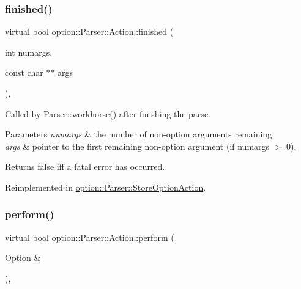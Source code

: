 \subsubsection{\texorpdfstring{finished()}{finished()}}
{\footnotesize\ttfamily virtual bool option\+::\+Parser\+::\+Action\+::finished (\begin{DoxyParamCaption}\item[{int}]{numargs,  }\item[{const char $\ast$$\ast$}]{args }\end{DoxyParamCaption})\hspace{0.3cm}{\ttfamily [inline]}, {\ttfamily [virtual]}}



Called by Parser\+::workhorse() after finishing the parse. 


\begin{DoxyParams}{Parameters}
{\em numargs} & the number of non-\/option arguments remaining \\
\hline
{\em args} & pointer to the first remaining non-\/option argument (if numargs $>$ 0).\\
\hline
\end{DoxyParams}
\begin{DoxyReturn}{Returns}
{\ttfamily false} iff a fatal error has occurred. 
\end{DoxyReturn}


Reimplemented in \hyperlink{classoption_1_1Parser_1_1StoreOptionAction_a617f675ef50a72ae36ce91f065bc8441}{option\+::\+Parser\+::\+Store\+Option\+Action}.

\mbox{\label{structoption_1_1Parser_1_1Action_a176b5f783bb35eb015b6d2c09422457d}} 
\subsubsection{\texorpdfstring{perform()}{perform()}}
{\footnotesize\ttfamily virtual bool option\+::\+Parser\+::\+Action\+::perform (\begin{DoxyParamCaption}\item[{\hyperlink{classoption_1_1Option}{Option} \&}]{ }\end{DoxyParamCaption})\hspace{0.3cm}{\ttfamily [inline]}, {\ttfamily [virtual]}}



